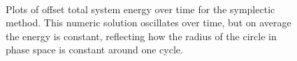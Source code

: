 \documentclass[a4paper, 11pt]{article}
\begin{document}
 \begin{figure}[H]
\\ 
\caption{Plots of offset total system energy over time for the symplectic method. This numeric solution oscillates over time, but on average the energy is constant, reflecting how the radius of the circle in phase space is constant around one cycle.}
\end{figure}
\end{document}
